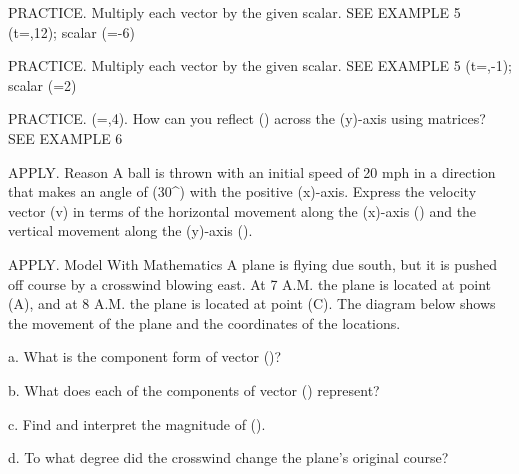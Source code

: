 \documentclass{article}
\newenvironment{practice}[2]{}{}        %
\newcommand{\answer}[1]{}               %
\newcommand{\placeholder}[2]{}          %
\newcommand{\te}[1]{}                   %
\begin{document}
\begin{practice}{29}{1}
PRACTICE. Multiply each vector by the given scalar. SEE EXAMPLE 5
(\vec t=,12\rangle); scalar (=-6)
\answer{(\langle-24,-72\rangle)}
\end{practice}
\begin{practice}{30}{1}
PRACTICE. Multiply each vector by the given scalar. SEE EXAMPLE 5
(\vec t=,-1\rangle); scalar (=2)
\answer{(\langle12,-2\rangle)}
\end{practice}
\begin{practice}{31}{1}
PRACTICE. (=,4\rangle). How can you reflect () across the (y)-axis using matrices? SEE EXAMPLE 6
\answer{Multiply (\vec{EF}=\langle8,4\rangle) by the matrix (\begin{bmatrix}-1&0\\0&1\end{bmatrix}) to get (\langle-8,4\rangle). (\langle-8,4\rangle) is the image of (\vec{EF}) after reflection across the y-axis.}
\end{practice}
\te{Printed page 506: See answers for Exercises 23--31 on the next page. Answers are placed with their items here.}
\begin{practice}{32}{2}
APPLY. Reason A ball is thrown with an initial speed of 20 mph in a direction that makes an angle of (30^\circ) with the positive (x)-axis. Express the velocity vector (\vec v) in terms of the horizontal movement along the (x)-axis () and the vertical movement along the (y)-axis ().
\answer{horizontal: 17.3 mph; vertical: 10 mph}
\end{practice}
\begin{practice}{33}{2}
APPLY. Model With Mathematics A plane is flying due south, but it is pushed off course by a crosswind blowing east. At 7 A.M. the plane is located at point (A), and at 8 A.M. the plane is located at point (C). The diagram below shows the movement of the plane and the coordinates of the locations.
\placeholder{diagram}{Right triangle with A(0,0) at top left, B directly below A, and C(40,600) to the right of B. Black arrow A to B points down and is labeled 600; black arrow B to C points right and is labeled 40; red resultant arrow A to C points down and right.}
a. What is the component form of vector ()?
\answer{a. (\langle40,600\rangle)}
b. What does each of the components of vector () represent?
\answer{b. 40 represents the wind speed of 40 mph; 600 represents the plane speed of 600 mph.}
c. Find and interpret the magnitude of ().
\answer{c. 601 mph represents the speed of the plane relative to the ground.}
d. To what degree did the crosswind change the plane's original course?
\answer{d. (3.8^\circ)}
\te{Printed diagram and component answer take south as positive in the second coordinate.}
\end{practice}
\end{document}
